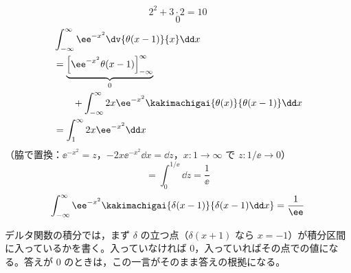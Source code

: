 \[ 2^{2}+3\cdot2=10 \]
\[ 0 \]
\begin{align*}
&\int_{-\infty}^{\infty}\ee^{-x^{2}}\dv{\theta(x-1)}{x}\dd x\\
&=\underbrace{\Bigl[\ee^{-x^{2}}\theta(x-1)\Bigr]_{-\infty}^{\infty}}_{0}\\
&\qquad+\int_{-\infty}^{\infty}2x\ee^{-x^{2}}\kakimachigai{\theta(x)}{\theta(x-1)}\dd x\\
&=\int_{1}^{\infty}2x\ee^{-x^{2}}\dd x
\end{align*}
（脇で置換：$\ee^{-x^{2}}=z$，$-2x\ee^{-x^{2}}\dd x=\dd z$，$x:1\to\infty$ で $z:1/\ee\to0$）
\[ =\int_{0}^{1/\ee}\dd z=\frac{1}{\ee} \]
\[ \int_{-\infty}^{\infty}\ee^{-x^{2}}\kakimachigai{\delta(x-1)}{\delta(x-1)\dd x}=\frac{1}{\ee} \]
\item デルタ関数の積分では，まず $\delta$ の立つ点（$\delta(x+1)$ なら $x=-1$）が積分区間に入っているかを書く。入っていなければ 0，入っていればその点での値になる。答えが 0 のときは，この一言がそのまま答えの根拠になる。
